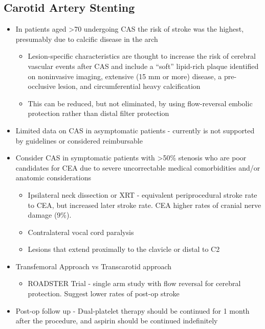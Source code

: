 \documentclass[
]{book}
\providecommand{\tightlist}{%
  \setlength{\itemsep}{0pt}\setlength{\parskip}{0pt}}
\begin{document}
\hypertarget{carotid-artery-stenting}{%
\subsection{Carotid Artery Stenting}\label{carotid-artery-stenting}}

\begin{itemize}
\item
  In patients aged \textgreater70 undergoing CAS the risk of stroke was the
  highest, presumably due to calcific disease in the arch

  \begin{itemize}
  \item
    Lesion-specific characteristics are thought to increase the risk
    of cerebral vascular events after CAS and include a ``soft''
    lipid-rich plaque identified on noninvasive imaging, extensive
    (15 mm or more) disease, a pre-occlusive lesion, and
    circumferential heavy calcification
  \item
    This can be reduced, but not eliminated, by using flow-reversal
    embolic protection rather than distal filter protection
  \end{itemize}
\item
  Limited data on CAS in asymptomatic patients - currently is not
  supported by guidelines or considered reimbursable
\item
  Consider CAS in symptomatic patients with \textgreater50\% stenosis who are poor
  candidates for CEA due to severe uncorrectable medical comorbidities
  and/or anatomic considerations

  \begin{itemize}
  \item
    Ipsilateral neck dissection or XRT - equivalent periprocedural
    stroke rate to CEA, but increased later stroke rate. CEA higher
    rates of cranial nerve damage (9\%).
    \citet{giannopoulosRevascularizationRadiationinducedCarotid2018}
  \item
    Contralateral vocal cord paralysis
  \item
    Lesions that extend proximally to the clavicle or distal to C2
  \end{itemize}
\item
  Transfemoral Approach vs Transcarotid approach

  \begin{itemize}
  \tightlist
  \item
    ROADSTER Trial - single arm study with flow reversal for
    cerebral protection. Suggest lower rates of post-op stroke
  \end{itemize}
\item
  Post-op follow up - Dual-platelet therapy should be continued for 1
  month after the procedure, and aspirin should be continued
  indefinitely


\end{itemize}
\end{document}
